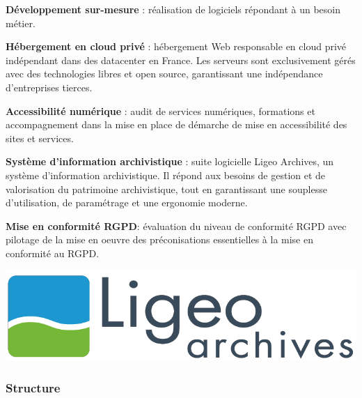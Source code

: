 \documentclass[12pt]{article}
\begin{document}
\noindent%
\begin{minipage}{.7\textwidth}%

\textbf{Développement sur-mesure} : réalisation de logiciels répondant à un besoin métier.

\textbf{Hébergement en cloud privé} : hébergement Web responsable en \gls{cloud privé} indépendant dans des datacenter en France. 
Les serveurs sont exclusivement gérés avec des technologies libres et open source, garantissant une indépendance d'entreprises tierces.

\textbf{Accessibilité numérique} : audit de services numériques, formations et accompagnement dans la mise en place de démarche de mise en accessibilité des sites et services.

\textbf{Système d'information archivistique} : suite logicielle Ligeo Archives, un système d'information archivistique. 
Il répond aux besoins de gestion et de valorisation du patrimoine archivistique, tout en garantissant une souplesse d'utilisation, de paramétrage et une ergonomie moderne.

\textbf{Mise en conformité \gls{RGPD}}: évaluation du niveau de conformité \gls{RGPD} avec pilotage de la mise en oeuvre des préconisations essentielles à la mise en conformité au \gls{RGPD}.

\end{minipage}%
\hfill
\begin{minipage}{.3\textwidth}%
\begin{center}
    \includegraphics[scale=0.22]{src/logo_ligeo.png}
\end{center}
\end{minipage}%


\subsubsection{Structure}
\end{document}
